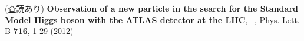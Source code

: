 \begin{thebibliography}{99}



         (査読あり) {\bf Observation of a new particle in the search for the Standard Model Higgs boson with the ATLAS detector at the LHC},
	  \me ~, 
	  Phys. Lett. B {\bf 716}, 1-29 (2012)

\end{thebibliography}




